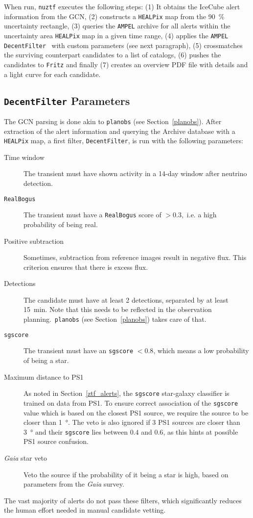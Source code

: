 When run, \texttt{nuztf} executes the following steps: (1) It obtains the IceCube alert information from the GCN, (2) constructs a \texttt{HEALPix} map from the \SI{90}{\percent} uncertainty rectangle, (3) queries the \texttt{AMPEL} archive for all alerts within the uncertainty area \texttt{HEALPix} map in a given time range, (4) applies the \texttt{AMPEL} \texttt{DecentFilter}~\cite{Nordin2019} with custom parameters (see next paragraph), (5) crossmatches the surviving counterpart candidates to a list of catalogs, (6) pushes the candidates to \texttt{Fritz} and finally (7) creates an overview PDF file with details and a light curve for each candidate.

\subsection{\texttt{DecentFilter} Parameters}
The GCN parsing is done akin to \texttt{planobs} (see Section~\ref{planobs}). After extraction of the alert information and querying the Archive database with a \texttt{HEALPix} map, a first filter, \texttt{DecentFilter}, is run with the following parameters:
\begin{description}
    \item[Time window] The transient must have shown activity in a 14-day window after neutrino detection.
    \item[\texttt{RealBogus}] The transient must have a \texttt{RealBogus} score of $>0.3$,~i.e. a high probability of being real.
    \item[Positive subtraction] Sometimes, subtraction from reference images result in negative flux. This criterion ensures that there is excess flux.
    \item[Detections] The candidate must have at least 2 detections, separated by at least \SI{15}{\minute}. Note that this needs to be reflected in the observation planning.\ \texttt{planobs} (see Section~\ref{planobs}) takes care of that.
    \item[\texttt{sgscore}] The transient must have an \texttt{sgscore} $<0.8$, which means a low probability of being a star.
    \item[Maximum distance to PS1] As noted in Section~\ref{ztf_alerts}, the \texttt{sgscore} star-galaxy classifier is trained on data from PS1. To ensure correct association of the \texttt{sgscore} value which is based on the closest PS1 source, we require the source to be closer than \SI{1}{\degree}. The veto is also ignored if 3 PS1 sources are closer than \SI{3}{\degree} and their \texttt{sgscore} lies between $0.4$ and $0.6$, as this hints at possible PS1 source confusion.
    \item[\textit{Gaia} star veto] Veto the source if the probability of it being a star is high, based on parameters from the \textit{Gaia} survey.
\end{description}
The vast majority of alerts do not pass these filters, which significantly reduces the human effort needed in manual candidate vetting.

